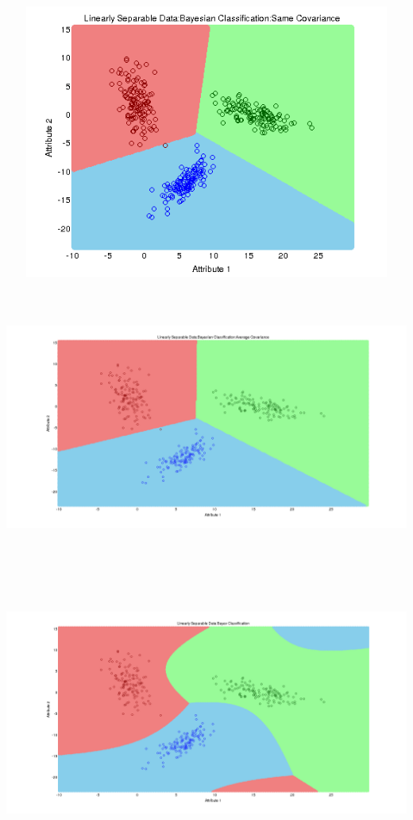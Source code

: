 \documentclass[a4paper]{article}
\begin{document}
			
		\centerline{\includegraphics[width=160mm,height=90mm]{plots/bayes/ls/same_cov.png}}
 		\centerline{\includegraphics[width=160mm,height=90mm]{plots/bayes/ls/avg_cov.png}}
 		\centerline{\includegraphics[width=160mm,height=90mm]{plots/bayes/ls/diff_cov.png}}
\end{document}
